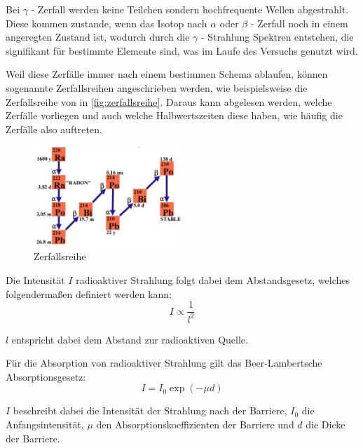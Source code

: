 \documentclass[12pt,english,ngerman]{scrartcl}
\begin{document}
Bei \(\gamma\) - Zerfall werden keine Teilchen sondern hochfrequente Wellen abgestrahlt. Diese kommen zustande,
wenn das Isotop nach \(\alpha\) oder \(\beta\) - Zerfall noch in einem angeregten Zustand ist, wodurch durch die
\(\gamma\) - Strahlung Spektren entstehen, die signifikant für bestimmte Elemente sind, was im Laufe des Versuchs
genutzt wird.


Weil diese Zerfälle immer nach einem bestimmen Schema ablaufen, können sogenannte Zerfallsreihen angeschrieben werden,
wie beispielsweise die Zerfallsreihe von  in \autoref{fig:zerfallsreihe}. Daraus kann abgelesen
werden, welche Zerfälle vorliegen und auch welche Halbwertszeiten diese haben, wie häufig die Zerfälle also auftreten.

\begin{figure}[H]
  \begin{center}
  \includegraphics[width = 0.5\textwidth]{./figures/zerfallsreihe.png}
	
\end{center}
	\caption{Zerfallsreihe ~\cite[]{}}
	\label{fig:zerfallsreihe}

\end{figure}


Die Intensität \(I\) radioaktiver Strahlung folgt dabei dem Abstandsgesetz,
welches folgendermaßen definiert werden kann:
\begin{equation}
  I \propto \frac{1}{l^2}
  \label{eq:abstandsgesetz}
\end{equation}

\(l\) entspricht dabei dem Abstand zur radioaktiven Quelle.

Für die Absorption von radioaktiver Strahlung gilt das Beer-Lambertsche
Absorptionsgesetz:
\begin{equation}
  I = I_0 \exp(-\mu d)
  \label{eq:beerschesgesetzt}
\end{equation}

\(I\) beschreibt dabei die Intensität der Strahlung nach der Barriere, \(I_0\)
die Anfangsintensität, \(\mu\) den Absorptionskoeffizienten der Barriere und
\(d\) die Dicke der Barriere.
\end{document}
